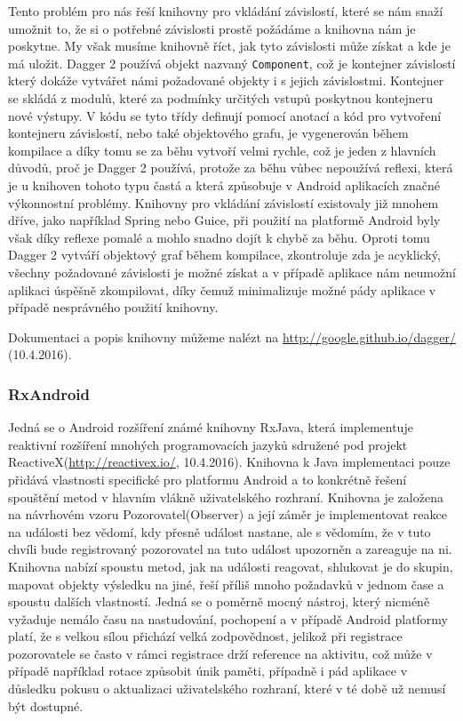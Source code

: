 \documentclass[czech,master,public,dept460,male,java,cpdeclaration]{diploma}
\begin{document}
Tento problém pro nás řeší knihovny pro vkládání závislostí, které se nám snaží umožnit to, že si o potřebné
závislosti prostě požádáme a knihovna nám je poskytne. My však musíme knihovně říct, jak tyto závislosti může
získat a kde je má uložit. Dagger 2 používá objekt nazvaný \texttt{Component}, což je kontejner závislostí
který dokáže vytvářet námi požadované objekty i s jejich závislostmi. Kontejner se skládá z modulů, které
za podmínky určitých vstupů poskytnou kontejneru nové výstupy. V kódu se tyto třídy definují pomocí anotací
a kód pro vytvoření kontejneru závislostí, nebo také objektového grafu, je vygenerován během kompilace
a díky tomu se za běhu vytvoří velmi rychle, což je jeden z hlavních důvodů, proč je Dagger 2 používá,
protože za běhu vůbec nepoužívá reflexi, která je u knihoven tohoto typu častá a která způsobuje v Android
aplikacích značné výkonnostní problémy. Knihovny pro vkládání závislostí existovaly již mnohem dříve,
jako například Spring nebo Guice, při použití na platformě Android byly však díky reflexe pomalé a mohlo snadno
dojít k chybě za běhu. Oproti tomu Dagger 2 vytváří objektový graf během kompilace, zkontroluje zda je acyklický,
všechny požadované závislosti je možné získat a v případě aplikace nám neumožní aplikaci úspěšně zkompilovat,
díky čemuž minimalizuje možné pády aplikace v případě nesprávného použití knihovny.

Dokumentaci a popis knihovny můžeme nalézt na \url{http://google.github.io/dagger/}  (10.4.2016).

\subsubsection{RxAndroid}\label{rxandroid}
Jedná se o Android rozšíření známé knihovny RxJava, která implementuje reaktivní rozšíření
mnohých programovacích jazyků sdružené pod projekt ReactiveX(\url{http://reactivex.io/}, 10.4.2016).
Knihovna k Java implementaci pouze přidává vlastnosti specifické pro platformu Android a to konkrétně
řešení spouštění metod v hlavním vlákně uživatelského rozhraní. Knihovna je založena na návrhovém
vzoru Pozorovatel(Observer) a její záměr je implementovat reakce na události bez vědomí, kdy přesně
událost nastane, ale s vědomím, že v tuto chvíli bude registrovaný pozorovatel na tuto událost
upozorněn a zareaguje na ni. Knihovna nabízí spoustu metod, jak na události reagovat, shlukovat je do
skupin, mapovat objekty výsledku na jiné, řeší příliš mnoho požadavků v jednom čase a spoustu dalších vlastností.
Jedná se o poměrně mocný nástroj, který nicméně vyžaduje nemálo času na nastudování, pochopení a v případě
Android platformy platí, že s velkou sílou přichází velká zodpovědnost, jelikož při registrace pozorovatele
se často v rámci registrace drží reference na aktivitu, což může v případě například rotace způsobit únik paměti,
případně i pád aplikace v důsledku pokusu o aktualizaci uživatelského rozhraní, které v té době už nemusí být dostupné.
\end{document}
